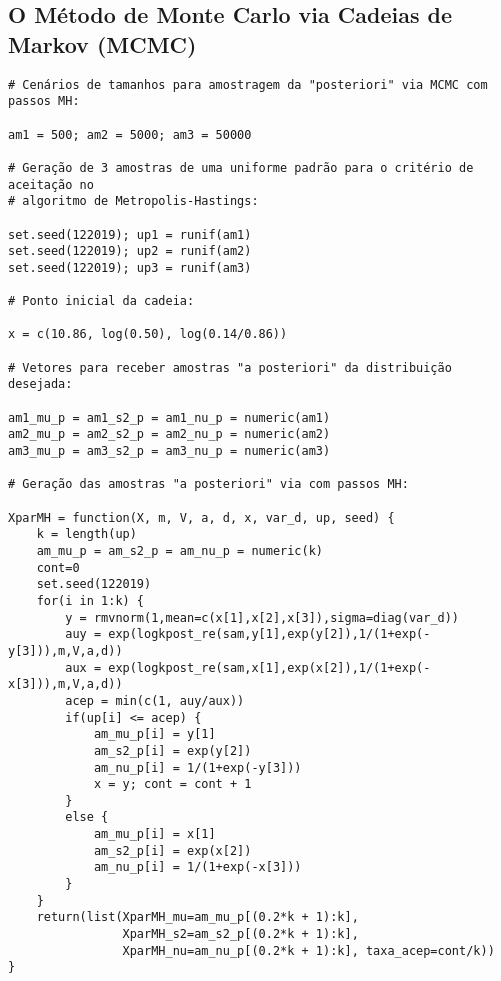 \newpage

\subsection*{O Método de Monte Carlo via Cadeias de Markov (MCMC)}

\begin{verbatim}
# Cenários de tamanhos para amostragem da "posteriori" via MCMC com passos MH:

am1 = 500; am2 = 5000; am3 = 50000

# Geração de 3 amostras de uma uniforme padrão para o critério de aceitação no
# algoritmo de Metropolis-Hastings:

set.seed(122019); up1 = runif(am1)
set.seed(122019); up2 = runif(am2)
set.seed(122019); up3 = runif(am3)

# Ponto inicial da cadeia:

x = c(10.86, log(0.50), log(0.14/0.86))

# Vetores para receber amostras "a posteriori" da distribuição desejada:

am1_mu_p = am1_s2_p = am1_nu_p = numeric(am1)
am2_mu_p = am2_s2_p = am2_nu_p = numeric(am2)
am3_mu_p = am3_s2_p = am3_nu_p = numeric(am3)

# Geração das amostras "a posteriori" via com passos MH:

XparMH = function(X, m, V, a, d, x, var_d, up, seed) {
	k = length(up)
	am_mu_p = am_s2_p = am_nu_p = numeric(k)
	cont=0
	set.seed(122019)
	for(i in 1:k) {
		y = rmvnorm(1,mean=c(x[1],x[2],x[3]),sigma=diag(var_d))
		auy = exp(logkpost_re(sam,y[1],exp(y[2]),1/(1+exp(-y[3])),m,V,a,d))
		aux = exp(logkpost_re(sam,x[1],exp(x[2]),1/(1+exp(-x[3])),m,V,a,d))
		acep = min(c(1, auy/aux))
		if(up[i] <= acep) {
			am_mu_p[i] = y[1]
			am_s2_p[i] = exp(y[2])
			am_nu_p[i] = 1/(1+exp(-y[3]))
			x = y; cont = cont + 1
		}
		else {
			am_mu_p[i] = x[1]
			am_s2_p[i] = exp(x[2])
			am_nu_p[i] = 1/(1+exp(-x[3]))
		}
	}
	return(list(XparMH_mu=am_mu_p[(0.2*k + 1):k],
				XparMH_s2=am_s2_p[(0.2*k + 1):k],
				XparMH_nu=am_nu_p[(0.2*k + 1):k], taxa_acep=cont/k))
}
\end{verbatim}

